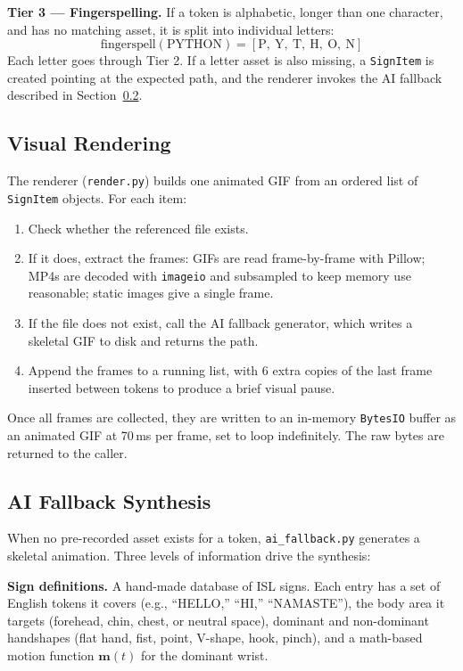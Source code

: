 \documentclass[conference]{IEEEtran}
\begin{document}
\textbf{Tier 3 --- Fingerspelling.} If a token is alphabetic, longer than one character, and has no matching asset, it is split into individual letters:
\begin{equation}
\text{fingerspell}(\text{PYTHON}) = [\text{P},\ \text{Y},\ \text{T},\ \text{H},\ \text{O},\ \text{N}]
\label{eq:fingerspell}
\end{equation}
Each letter goes through Tier 2. If a letter asset is also missing, a \texttt{SignItem} is created pointing at the expected path, and the renderer invokes the AI fallback described in Section~\ref{subsec:ai_fallback}.

\subsection{Visual Rendering}

The renderer (\texttt{render.py}) builds one animated GIF from an ordered list of \texttt{SignItem} objects. For each item:

\begin{enumerate}
    \item Check whether the referenced file exists.
    \item If it does, extract the frames: GIFs are read frame-by-frame with Pillow; MP4s are decoded with \texttt{imageio} and subsampled to keep memory use reasonable; static images give a single frame.
    \item If the file does not exist, call the AI fallback generator, which writes a skeletal GIF to disk and returns the path.
    \item Append the frames to a running list, with 6 extra copies of the last frame inserted between tokens to produce a brief visual pause.
\end{enumerate}

Once all frames are collected, they are written to an in-memory \texttt{BytesIO} buffer as an animated GIF at 70\,ms per frame, set to loop indefinitely. The raw bytes are returned to the caller.

\subsection{AI Fallback Synthesis}
\label{subsec:ai_fallback}

When no pre-recorded asset exists for a token, \texttt{ai\_fallback.py} generates a skeletal animation. Three levels of information drive the synthesis:

\textbf{Sign definitions.} A hand-made database of ISL signs. Each entry has a set of English tokens it covers (e.g., ``HELLO,'' ``HI,'' ``NAMASTE''), the body area it targets (forehead, chin, chest, or neutral space), dominant and non-dominant handshapes (flat hand, fist, point, V-shape, hook, pinch), and a math-based motion function $\mathbf{m}(t)$ for the dominant wrist.
\end{document}
